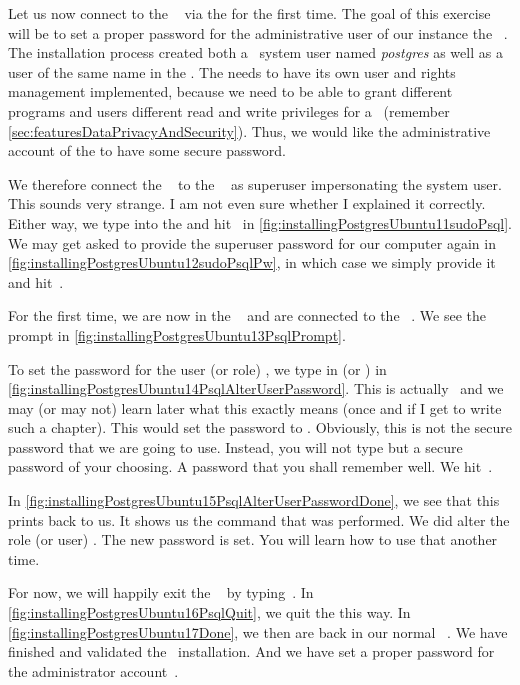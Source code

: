 Let us now connect to the \postgresql\  via the  for the first time.
The goal of this exercise will be to set a proper password for the administrative user of our instance the \postgresql\ .
The installation process created both a \linux\ system user named \textit{postgres} as well as a user of the same name in the .
The  needs to have its own user and rights management implemented, because we need to be able to grant different programs and users different read and write privileges for a ~(remember \cref{sec:featuresDataPrivacyAndSecurity}).
Thus, we would like the administrative account  of the  to have some secure password.

We therefore connect the \psql\  to the \postgresql\  as superuser impersonating the  system user.
This sounds very strange.
I am not even sure whether I explained it correctly.
Either way, we type  into the  and hit~\keys{\enter} in \cref{fig:installingPostgresUbuntu11sudoPsql}.
We may get asked to provide the superuser password for our computer again in \cref{fig:installingPostgresUbuntu12sudoPsqlPw}, in which case we simply provide it and hit~\keys{\enter}.

For the first time, we are now in the \psql\  and are connected to the \postgresql\ .
We see the prompt \expandafter{} in \cref{fig:installingPostgresUbuntu13PsqlPrompt}.%
%
\begin{sloppypar}%
To set the password for the user (or role) , we type in  (or ) in \cref{fig:installingPostgresUbuntu14PsqlAlterUserPassword}.
This is actually \sql\ and we may (or may not) learn later what this exactly means (once and if I get to write such a chapter).
This would set the password to .
Obviously, this is not the secure password that we are going to use.
Instead, you will not type  but a secure password of your choosing.
A password that you shall remember well.
We hit~\keys{\enter}.%
\end{sloppypar}%
%
In \cref{fig:installingPostgresUbuntu15PsqlAlterUserPasswordDone}, we see that this prints  back to us.
It shows us the command that was performed.
We did alter the role (or user) .
The new password is set.
You will learn how to use that another time.

For now, we will happily exit the \psql\  by typing~.
In \cref{fig:installingPostgresUbuntu16PsqlQuit}, we quit the  this way.
In \cref{fig:installingPostgresUbuntu17Done}, we then are back in our normal \bash\ .
We have finished and validated the \postgresql\ installation.
And we have set a proper password for the administrator account~.%
%
\FloatBarrier%
\endhsection%
%
